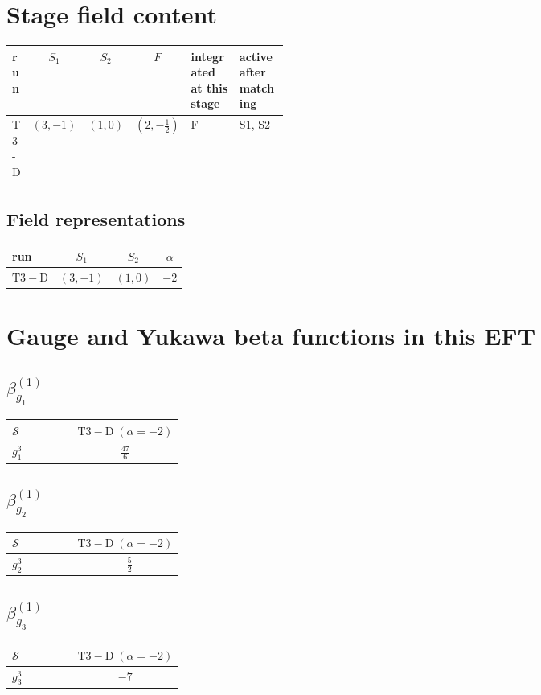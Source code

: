 \documentclass[9pt]{article}
\begin{document}
\section*{Stage field content}
\begin{longtable}{@{}lccc p{0.20\linewidth}p{0.20\linewidth}@{}}
\toprule
run & $S_1$ & $S_2$ & $F$ & integrated at this stage & active after matching \\
\midrule
T3-D & $(3,-1)$ & $(1,0)$ & $(2,- \frac{1}{2})$ & F & S1, S2 \\
\bottomrule
\end{longtable}
\subsection*{Field representations}
\begin{longtable}{@{}lccc@{}}
\toprule
run & $S_1$ & $S_2$ & $\alpha$ \\
\midrule
$\mathrm{T3-D}$ & $(3,-1)$ & $(1,0)$ & $-2$ \\
\bottomrule
\end{longtable}
\section*{Gauge and Yukawa beta functions in this EFT}
\subsection*{$ \beta_{g_1}^{(1)} $}
\begin{longtable}{@{}p{0.38\linewidth}c@{}}
\toprule
$\mathcal{S}$ & $ \mathrm{T3-D}\;(\alpha=-2) $ \\
\midrule
$ g_1^3 $ & $ \frac{47}{6} $ \\
\bottomrule
\end{longtable}
\subsection*{$ \beta_{g_2}^{(1)} $}
\begin{longtable}{@{}p{0.38\linewidth}c@{}}
\toprule
$\mathcal{S}$ & $ \mathrm{T3-D}\;(\alpha=-2) $ \\
\midrule
$ g_2^3 $ & $ - \frac{5}{2} $ \\
\bottomrule
\end{longtable}
\subsection*{$ \beta_{g_3}^{(1)} $}
\begin{longtable}{@{}p{0.38\linewidth}c@{}}
\toprule
$\mathcal{S}$ & $ \mathrm{T3-D}\;(\alpha=-2) $ \\
\midrule
$ g_3^3 $ & $ -7 $ \\
\bottomrule
\end{longtable}
\end{document}
